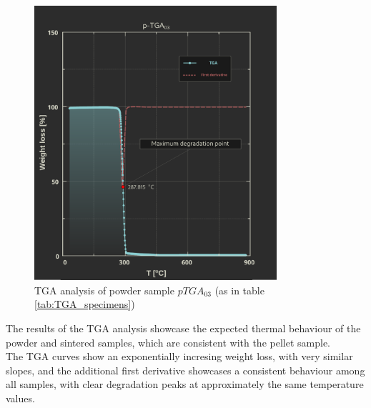 \documentclass[a4paper]{article}
\begin{document}
        \begin{figure}[H]
            \centering
            \includegraphics[width=0.8\textwidth]{Pictures/Thermal_analysis_plots/TGA_catalogued/Fixed/p-TGA03.pdf}
            \caption{TGA analysis of powder sample $pTGA_{03}$ (as in table \ref{tab:TGA_specimens})}
            \label{fig:TGA_03}
        \end{figure}


            The results of the TGA analysis showcase the expected thermal behaviour of the powder and sintered samples,
            which are consistent with the pellet sample. \\ 

            The TGA curves show an exponentially incresing weight loss, with very similar slopes, and the additional 
            first derivative showcases a consistent behaviour among all samples, with clear degradation peaks at approximately 
            the same temperature values. \\ 
\end{document}
